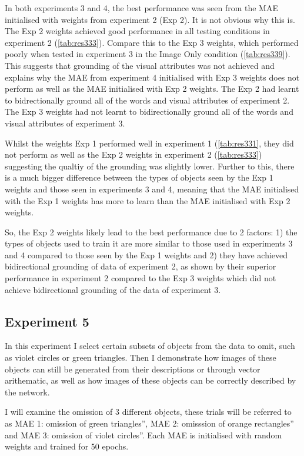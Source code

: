 In both experiments 3 and 4, the best performance was seen from the MAE initialised with weights from experiment 2 (Exp 2). It is not obvious why this is. The Exp 2 weights achieved good performance in all testing conditions in experiment 2 (\autoref{tab:res333}). Compare this to the Exp 3 weights, which performed poorly when tested in experiment 3 in the Image Only condition (\autoref{tab:res339}). This suggests that grounding of the visual attributes was not achieved and explains why the MAE from experiment 4 initialised with Exp 3 weights does not perform as well as the MAE initialised with Exp 2 weights. The Exp 2 had learnt to bidrectionally ground all of the words and visual attributes of experiment 2. The Exp 3 weights had not learnt to bidirectionally ground all of the words and visual attributes of experiment 3.

Whilst the weights Exp 1 performed well in experiment 1 (\autoref{tab:res331}, they did not perform as well as the Exp 2 weights in experiment 2 (\autoref{tab:res333}) suggesting the qualtiy of the grounding was slightly lower. Further to this, there is a much bigger difference between the types of objects seen by the Exp 1 weights and those seen in experiments 3 and 4, meaning that the MAE initialised with the Exp 1 weights has more to learn than the MAE initialised with Exp 2 weights.

So, the Exp 2 weights likely lead to the best performance due to 2 factors: 1) the types of objects used to train it are more similar to those used in experiments 3 and 4 compared to those seen by the Exp 1 weights and 2) they have achieved bidirectional grounding of data of experiment 2, as shown by their superior performance in experiment 2 compared to the Exp 3 weights which did not achieve bidirectional grounding of the data of experiment 3.


\subsection{Experiment 5}
In this experiment I select certain subsets of objects from the data to omit, such as violet circles or green triangles. Then I demonstrate how images of these objects can still be generated from their descriptions or through vector arithematic, as well as how images of these objects can be correctly described by the network.

I will examine the omission of 3 different objects, these trials will be referred to as MAE 1: omission of green triangles'', MAE 2: omisssion of orange rectangles'' and MAE 3: omission of  violet circles''. Each MAE is initialised with random weights and trained for 50 epochs.

